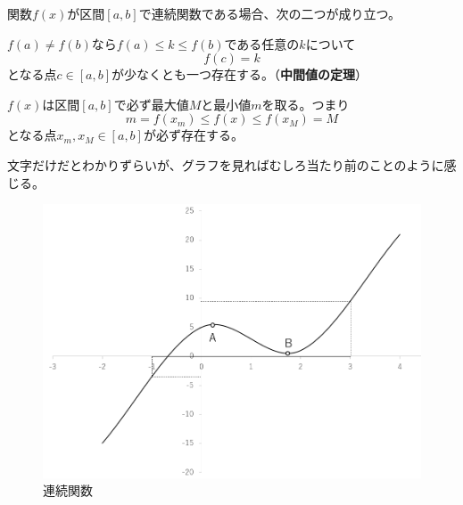 \documentclass[a4j,dvipdfmx]{jsarticle}
\begin{document}
                関数$f(x)$が区間$[a,b]$で連続関数である場合、次の二つが成り立つ。
                \begin{screen}
                    $f(a)\neq f(b)$なら$f(a)\leq k \leq f(b)$である任意の$k$について
                    \begin{equation*}
                        f(c)=k \label{eq:中間値の定理}
                    \end{equation*}
                    となる点$c\in[a,b]$が少なくとも一つ存在する。（\textbf{中間値の定理}）
                \end{screen}
                \begin{screen}
                    $f(x)$は区間$[a,b]$で必ず最大値$M$と最小値$m$を取る。つまり
                    \begin{equation*}
                        m=f(x_m)\leq f(x)\leq f(x_M)=M
                    \end{equation*}
                    となる点$x_m,x_M\in[a,b]$が必ず存在する。
                \end{screen}
                文字だけだとわかりずらいが、グラフを見ればむしろ当たり前のことのように感じる。
                \begin{figure}[h]
                    \centering
                    \includegraphics[keepaspectratio,scale=0.3]{img/QuuNote/ContinuousFuncGraph.png}
                    \caption{連続関数}\label{fig:連続関数,中間値の定理,最大最小}
                \end{figure}
\end{document}
